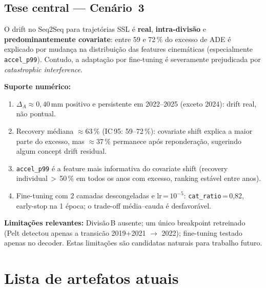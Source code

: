 \documentclass[11pt,a4paper]{article}
\begin{document}
\subsection{Tese central --- Cen\'ario~3}

O drift no Seq2Seq para trajet\'orias SSL \'e \textbf{real},
\textbf{intra-divis\~ao} e \textbf{predominantemente covariate}:
entre 59 e 72\,\% do excesso de ADE \'e explicado por mudan\c{c}a na
distribui\c{c}\~ao das features cinem\'aticas (especialmente
\texttt{accel\_p99}). Contudo, a adapta\c{c}\~ao por fine-tuning \'e
severamente prejudicada por \emph{catastrophic interference}.

\textbf{Suporte num\'erico:}
\begin{enumerate}[leftmargin=1.6em,itemsep=2pt]
    \item $\Delta_A \approx 0{,}40$\,mm positivo e persistente em
          2022--2025 (exceto 2024): drift real, n\~ao pontual.
    \item Recovery m\'ediana $\approx 63\,\%$ (IC\,95: 59--72\,\%):
          covariate shift explica a maior parte do excesso, mas
          $\approx 37\,\%$ permanece ap\'os repondera\c{c}\~ao,
          sugerindo algum concept drift residual.
    \item \texttt{accel\_p99} \'e a feature mais informativa do
          covariate shift (recovery individual\,$>$\,50\,\% em todos
          os anos com excesso, ranking est\'avel entre anos).
    \item Fine-tuning com 2 camadas descongeladas e lr\,=\,$10^{-5}$:
          \texttt{cat\_ratio}\,=\,0{,}82, early-stop na 1\textordfeminine{} \'epoca;
          o trade-off m\'edia--cauda \'e desfavor\'avel.
\end{enumerate}

\textbf{Limita\c{c}\~oes relevantes:} Divis\~ao\,B ausente; um \'unico
breakpoint retreinado (Pelt detectou apenas a transic\~ao 2019+2021
$\to$ 2022); fine-tuning testado apenas no decoder. Estas limita\c{c}\~oes
s\~ao candidatas naturais para trabalho futuro.

\section*{Lista de artefatos atuais}
\end{document}

